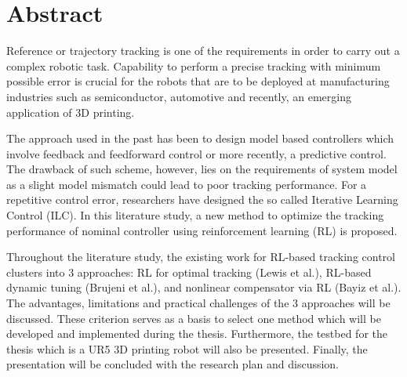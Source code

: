 %
\chapter*{Abstract}%

Reference or trajectory tracking is one of the requirements in order to carry out a complex robotic task. Capability to perform a precise tracking with minimum possible error is crucial for the robots that are to be deployed at manufacturing industries such as semiconductor, automotive and recently, an emerging application of 3D printing.

The approach used in the past has been to design model based controllers which involve feedback and feedforward control or more recently, a predictive control. The drawback of such scheme, however, lies on the requirements of system model as a slight model mismatch could lead to poor tracking performance. For a repetitive control error, researchers have designed the so called Iterative Learning Control (ILC). In this literature study, a new method to optimize the tracking performance of nominal controller using reinforcement learning (RL) is proposed. 

Throughout the literature study, the existing work for RL-based tracking control clusters into 3 approaches: RL for optimal tracking (Lewis et al.), RL-based dynamic tuning (Brujeni et al.), and nonlinear compensator via RL (Bayiz et al.). The advantages, limitations and practical challenges of the 3 approaches will be discussed. These criterion serves as a basis to select one method which will be developed and implemented during the thesis. Furthermore, the testbed for the thesis which is a UR5 3D printing robot will also be presented. Finally, the presentation will be concluded with the research plan and discussion.